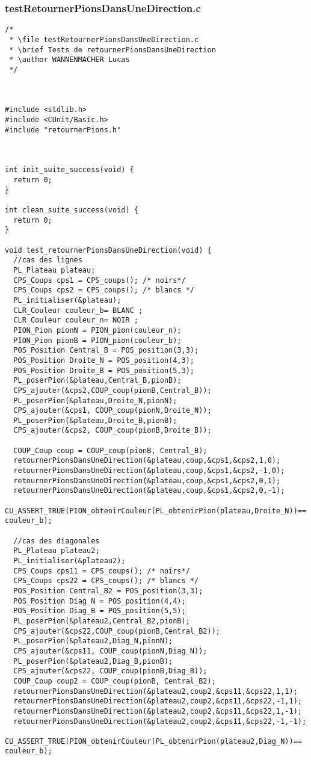\subsubsection{testRetournerPionsDansUneDirection.c}
\begin{lstlisting}
/*
 * \file testRetournerPionsDansUneDirection.c
 * \brief Tests de retournerPionsDansUneDirection
 * \author WANNENMACHER Lucas
 */



#include <stdlib.h>
#include <CUnit/Basic.h>
#include "retournerPions.h"



int init_suite_success(void) {
  return 0;
}

int clean_suite_success(void) {
  return 0;
}

void test_retournerPionsDansUneDirection(void) {
  //cas des lignes
  PL_Plateau plateau;
  CPS_Coups cps1 = CPS_coups(); /* noirs*/
  CPS_Coups cps2 = CPS_coups(); /* blancs */
  PL_initialiser(&plateau);
  CLR_Couleur couleur_b= BLANC ;
  CLR_Couleur couleur_n= NOIR ;
  PION_Pion pionN = PION_pion(couleur_n);
  PION_Pion pionB = PION_pion(couleur_b);
  POS_Position Central_B = POS_position(3,3);
  POS_Position Droite_N = POS_position(4,3);
  POS_Position Droite_B = POS_position(5,3);
  PL_poserPion(&plateau,Central_B,pionB);
  CPS_ajouter(&cps2,COUP_coup(pionB,Central_B));
  PL_poserPion(&plateau,Droite_N,pionN);
  CPS_ajouter(&cps1, COUP_coup(pionN,Droite_N));
  PL_poserPion(&plateau,Droite_B,pionB);
  CPS_ajouter(&cps2, COUP_coup(pionB,Droite_B));

  COUP_Coup coup = COUP_coup(pionB, Central_B);
  retournerPionsDansUneDirection(&plateau,coup,&cps1,&cps2,1,0);
  retournerPionsDansUneDirection(&plateau,coup,&cps1,&cps2,-1,0);
  retournerPionsDansUneDirection(&plateau,coup,&cps1,&cps2,0,1);
  retournerPionsDansUneDirection(&plateau,coup,&cps1,&cps2,0,-1);
  CU_ASSERT_TRUE(PION_obtenirCouleur(PL_obtenirPion(plateau,Droite_N))== couleur_b);

  //cas des diagonales
  PL_Plateau plateau2;
  PL_initialiser(&plateau2);
  CPS_Coups cps11 = CPS_coups(); /* noirs*/
  CPS_Coups cps22 = CPS_coups(); /* blancs */
  POS_Position Central_B2 = POS_position(3,3);
  POS_Position Diag_N = POS_position(4,4);
  POS_Position Diag_B = POS_position(5,5);
  PL_poserPion(&plateau2,Central_B2,pionB);
  CPS_ajouter(&cps22,COUP_coup(pionB,Central_B2));
  PL_poserPion(&plateau2,Diag_N,pionN);
  CPS_ajouter(&cps11, COUP_coup(pionN,Diag_N));
  PL_poserPion(&plateau2,Diag_B,pionB);
  CPS_ajouter(&cps22, COUP_coup(pionB,Diag_B));
  COUP_Coup coup2 = COUP_coup(pionB, Central_B2);
  retournerPionsDansUneDirection(&plateau2,coup2,&cps11,&cps22,1,1);
  retournerPionsDansUneDirection(&plateau2,coup2,&cps11,&cps22,-1,1);
  retournerPionsDansUneDirection(&plateau2,coup2,&cps11,&cps22,1,-1);
  retournerPionsDansUneDirection(&plateau2,coup2,&cps11,&cps22,-1,-1);
  CU_ASSERT_TRUE(PION_obtenirCouleur(PL_obtenirPion(plateau2,Diag_N))== couleur_b);


\end{lstlisting}
